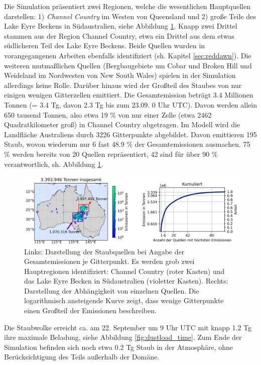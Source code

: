 \documentclass[12pt,a4paper,onecolumn,draft]{scrartcl}
\begin{document}
Die Simulation präsentiert zwei Regionen, welche die wesentlichen Hauptquellen darstellen: 1) \textit{Channel Country} im Westen von Queensland und 2) große Teile des Lake Eyre Beckens in Südaustralien, siehe Abbildung \ref{fig:emissions}. Knapp zwei Drittel stammen aus der Region Channel Country, etwa ein Drittel aus dem etwas südlicheren Teil des Lake Eyre Beckens. Beide Quellen wurden in vorangegangenen Arbeiten ebenfalls identifiziert (sh. Kapitel \ref{sec:reddawn}). Die weiteren mutmaßlichen Quellen (Bergbaugebiete um Cobar und Broken Hill und Weideland im Nordwesten von New South Wales) spielen in der Simulation allerdings keine Rolle. Darüber hinaus wird der Großteil des Staubes von nur einigen wenigen Gitterzellen emittiert. Die Gesamtemission beträgt 3.4 Millionen Tonnen (= 3.4 Tg, davon 2.3 Tg bis zum 23.09. 0 Uhr UTC). Davon werden allein 650 tausend Tonnen, also etwa 19 \% von nur einer Zelle (etwa 2462 Quadratkilometer groß) in Channel Country abgetragen. Im Modell wird die Landfläche Australiens durch 3226 Gitterpunkte abgebildet. Davon emittieren 195 Staub, wovon wiederum nur 6 fast 48.9 \% der Gesamtemissionen ausmachen. 75 \% werden bereits von 20 Quellen repräsentiert, 42 sind für über 90 \% verantwortlich, sh. Abbildung \ref{fig:emissions}. 
\begin{figure}
\includegraphics[width=\textwidth]{bilder/emission_sections.png}
\caption{Links: Darstellung der Staubquellen bei Angabe der Gesamtemissionen je Gitterpunkt. Es werden grob zwei Hauptregionen identifiziert: Channel Country (roter Kasten) und das Lake Eyre Becken in Südaustralien (violetter Kasten). Rechts: Darstellung der Abhängigkeit von einzelnen Quellen. Die logarithmisch ansteigende Kurve zeigt, dass wenige Gitterpunkte einen Großteil der Emissionen beschreiben.} \label{fig:emissions}
\end{figure}
Die Staubwolke erreicht ca. am 22. September um 9 Uhr UTC mit knapp 1.2 Tg ihre maximale Beladung, siehe Abbildung \ref{fig:dustload_time}. Zum Ende der Simulation befinden sich noch etwa 0.2 Tg Staub in der Atmosphäre, ohne Berücksichtigung des Teils außerhalb der Domäne.
\end{document}
